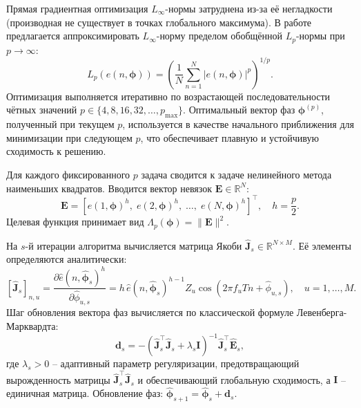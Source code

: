 Прямая градиентная оптимизация $L_\infty$-нормы затруднена из-за её негладкости (производная не существует в точках глобального максимума). В работе предлагается аппроксимировать $L_\infty$-норму пределом обобщённой $L_p$-нормы при $p \to \infty$:
\begin{equation}
    L_p(e(n, \boldsymbol{\phi})) = \left( \frac{1}{N} \sum_{n=1}^{N} |e(n, \boldsymbol{\phi})|^p \right)^{1/p}.
    \label{eq:lp_norm}
\end{equation}
Оптимизация выполняется итеративно по возрастающей последовательности чётных значений $p \in \{4, 8, 16, 32, \dots, p_{\max}\}$. Оптимальный вектор фаз $\boldsymbol{\phi}^{(p)}$, полученный при текущем $p$, используется в качестве начального приближения для минимизации при следующем $p$, что обеспечивает плавную и устойчивую сходимость к решению.

Для каждого фиксированного $p$ задача сводится к задаче нелинейного метода наименьших квадратов. Вводится вектор невязок $\mathbf{E} \in \mathbb{R}^N$:
\begin{equation}
\mathbf{E} = \left[ e(1, \boldsymbol{\phi})^h,\; e(2, \boldsymbol{\phi})^h,\; \dots,\; e(N, \boldsymbol{\phi})^h \right]^\top, \quad h = \frac{p}{2}.
\label{eq:residual}
\end{equation}
Целевая функция принимает вид $\Lambda_p(\boldsymbol{\phi}) = \|\mathbf{E}\|^2$.

На $s$-й итерации алгоритма вычисляется матрица Якоби $\hat{\mathbf{J}}_s \in \mathbb{R}^{N \times M}$. Её элементы определяются аналитически:
\begin{equation}
\left[ \hat{\mathbf{J}}_s \right]_{n,u} = \frac{\partial \hat{e}(n, \hat{\boldsymbol{\phi}}_s)^h}{\partial \hat{\phi}_{u,s}} = h \, \hat{e}(n, \hat{\boldsymbol{\phi}}_s)^{h-1} Z_u \cos(2\pi f_u T n + \hat{\phi}_{u,s}), \quad u=1,\dots,M.
\label{eq:jacobian}
\end{equation}
Шаг обновления вектора фаз вычисляется по классической формуле Левенберга-Марквардта:
\begin{equation}
\mathbf{d}_s = - \left( \hat{\mathbf{J}}_s^\top \hat{\mathbf{J}}_s + \lambda_s \mathbf{I} \right)^{-1} \hat{\mathbf{J}}_s^\top \hat{\mathbf{E}}_s,
\label{eq:lm_step}
\end{equation}
где $\lambda_s > 0$ -- адаптивный параметр регуляризации, предотвращающий вырожденность матрицы $\hat{\mathbf{J}}_s^\top \hat{\mathbf{J}}_s$ и обеспечивающий глобальную сходимость, а $\mathbf{I}$ -- единичная матрица. Обновление фаз: $\hat{\boldsymbol{\phi}}_{s+1} = \hat{\boldsymbol{\phi}}_s + \mathbf{d}_s$.

